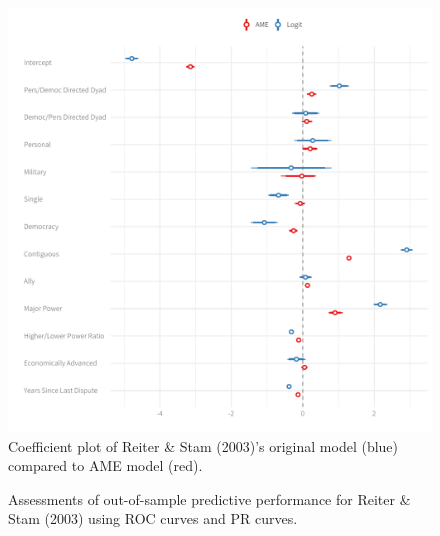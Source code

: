 \begin{figure}
\includegraphics[width=\textwidth]{reiter_coefs_all.pdf}
\caption{\label{fig:reitCoef} Coefficient plot of Reiter \& Stam (2003)'s original model (blue) compared to AME model (red). }
\end{figure}

\begin{figure}
\centering   
{}
\caption{Assessments of out-of-sample predictive performance for Reiter \& Stam (2003) using ROC curves and PR curves.}
\end{figure}

